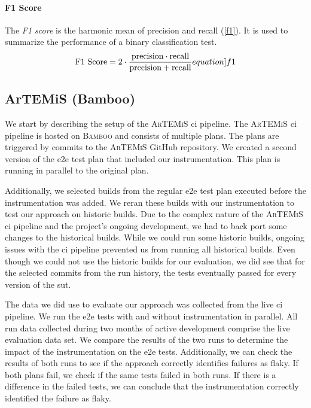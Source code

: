 \paragraph{F1 Score} The \emph{F1 score} is the harmonic mean of precision and recall (\ref{f1}).
It is used to summarize the performance of a binary classification test.
\begin{equation}
	\text{F1 Score} = 2 \cdot \frac{\text{precision} \cdot \text{recall}}{\text{precision} + \text{recall}}
	\label[equation]{f1}
\end{equation}

\subsection{ArTEMiS (Bamboo)}
We start by describing the setup of the \textsc{ArTEMiS} \ac{ci} pipeline.
The \textsc{ArTEMiS} \ac{ci} pipeline is hosted on \textsc{Bamboo} \autocite{atlassian_bamboo_nodate} and consists of multiple plans.
The plans are triggered by commits to the \textsc{ArTEMiS} GitHub repository.
We created a second version of the \ac{e2e} test plan that included our instrumentation.
This plan is running in parallel to the original plan.

Additionally, we selected builds from the regular \ac{e2e} test plan executed before the instrumentation was added.
We reran these builds with our instrumentation to test our approach on historic builds.
Due to the complex nature of the \textsc{ArTEMiS} \ac{ci} pipeline and the project's ongoing development, we had to back port some changes to the historical builds.
While we could run some historic builds, ongoing issues with the \ac{ci} pipeline prevented us from running all historical builds.
Even though we could not use the historic builds for our evaluation, we did see that for the selected commits from the run history, the tests eventually passed for every version of the \ac{sut}.

The data we did use to evaluate our approach was collected from the live \ac{ci} pipeline.
We run the \ac{e2e} tests with and without instrumentation in parallel.
All run data collected during two months of active development comprise the live evaluation data set.
We compare the results of the two runs to determine the impact of the instrumentation on the \ac{e2e} tests.
Additionally, we can check the results of both runs to see if the approach correctly identifies failures as flaky.
If both plans fail, we check if the same tests failed in both runs.
If there is a difference in the failed tests, we can conclude that the instrumentation correctly identified the failure as flaky.

